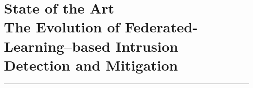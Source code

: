 \chapter[State of the Art]{State of the Art\\%
\Large The Evolution of Federated-Learning--based Intrusion Detection and Mitigation\label{chap:sota}}

\vspace{-9ex}
\localtableofcontents
\par\noindent\rule{\textwidth}{0.4pt}







